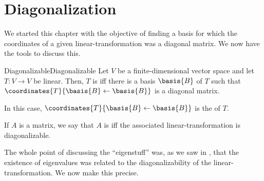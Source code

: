 \section{Diagonalization}

We started this chapter with the objective of finding a basis for which the coordinates of a given linear-transformation was a diagonal matrix.  We now have the tools to discuss this.
\begin{dfn}{Diagonalizable}{Diagonalizable}
	Let $V$ be a finite-dimensional vector space and let $T\colon V\rightarrow V$ be linear.  Then, $T$ is  iff there is a basis $\basis{B}$ of $T$ such that $\coordinates{T}{\basis{B}\leftarrow \basis{B}}$ is a diagonal matrix.
	\begin{rmk}
		In this case, $\coordinates{T}{\basis{B}\leftarrow \basis{B}}$ is the  of $T$.
	\end{rmk}
	\begin{rmk}
		If $A$ is a matrix, we say that $A$ is  iff the associated linear-transformation is diagonalizable.
	\end{rmk}
\end{dfn}
The whole point of discussing the ``eigenstuff'' was, as we saw in , that the existence of eigenvalues was related to the diagonalizability of the linear-transformation.  We now make this precise.
